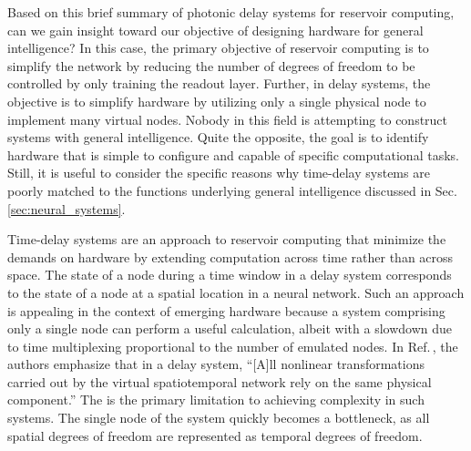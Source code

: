 Based on this brief summary of photonic delay systems for reservoir computing, can we gain insight toward our objective of designing hardware for general intelligence? In this case, the primary objective of reservoir computing is to simplify the network by reducing the number of degrees of freedom to be controlled by only training the readout layer. Further, in delay systems, the objective is to simplify hardware by utilizing only a single physical node to implement many virtual nodes. Nobody in this field is attempting to construct systems with general intelligence. Quite the opposite, the goal is to identify hardware that is simple to configure and capable of specific computational tasks. Still, it is useful to consider the specific reasons why time-delay systems are poorly matched to the functions underlying general intelligence discussed in Sec.\,\ref{sec:neural_systems}.

Time-delay systems are an approach to reservoir computing that minimize the demands on hardware by extending computation across time rather than across space. The state of a node during a time window in a delay system corresponds to the state of a node at a spatial location in a neural network. Such an approach is appealing in the context of emerging hardware because a system comprising only a single node can perform a useful calculation, albeit with a slowdown due to time multiplexing proportional to the number of emulated nodes. In Ref.\,\cite{brpe2018}, the authors emphasize that in a delay system, ``[A]ll nonlinear transformations carried out by the virtual spatiotemporal network rely on the same physical component.'' The is the primary limitation to achieving complexity in such systems. The single node of the system quickly becomes a bottleneck, as all spatial degrees of freedom are represented as temporal degrees of freedom. 

